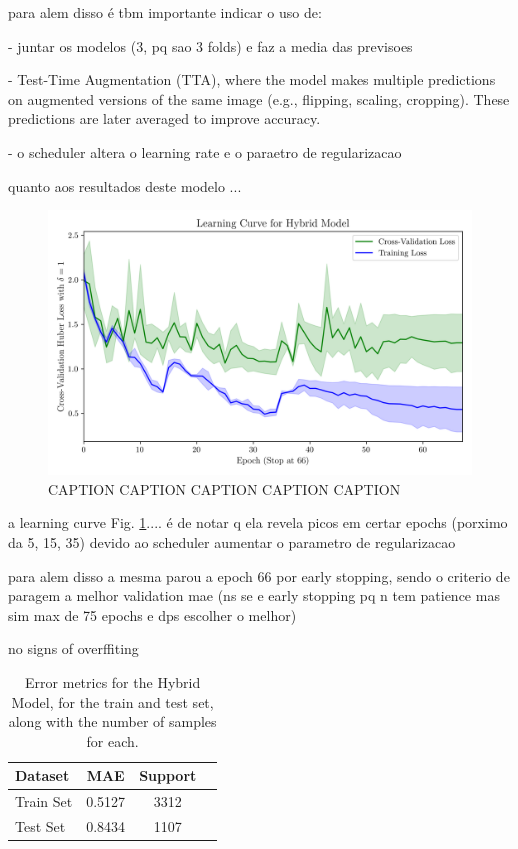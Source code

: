 \documentclass[conference]{IEEEtran}
\begin{document}
para alem disso é tbm importante indicar o uso de: 

- juntar os modelos (3, pq sao 3 folds) e faz a media das previsoes

- Test-Time Augmentation (TTA), where the model makes multiple predictions on augmented versions of the same image (e.g., flipping, scaling, cropping). These predictions are later averaged to improve accuracy.

- o scheduler altera o learning rate e o paraetro de regularizacao

quanto aos resultados deste modelo ...

\begin{figure}[H]
    \centering
    \includegraphics[width=1\linewidth]{assets/model01_lc.png}
    \caption{CAPTION CAPTION CAPTION CAPTION CAPTION}
    \label{fig:model01_lc}
\end{figure}

a learning curve Fig. \ref{fig:model01_lc}.... é de notar q ela revela picos em certar epochs (porximo da 5, 15, 35) devido ao scheduler aumentar o parametro de regularizacao

para alem disso a mesma parou a epoch 66 por early stopping, sendo o criterio de paragem a melhor validation mae (ns se e early stopping pq n tem patience mas sim max de 75 epochs e dps escolher o melhor)

no signs of overffiting

\begin{table}[H]
\centering
\caption{Error metrics for the Hybrid Model, for the train and test set, along with the number of samples for each.}
\label{tab:model01_results}
\begin{tabular}{lccc}
\toprule
\textbf{Dataset} & \textbf{MAE} & \textbf{Support} \\
\midrule
Train Set & 0.5127 & 3312 \\
Test Set & 0.8434 & 1107 \\
\bottomrule
\end{tabular}
\end{table}
\end{document}
